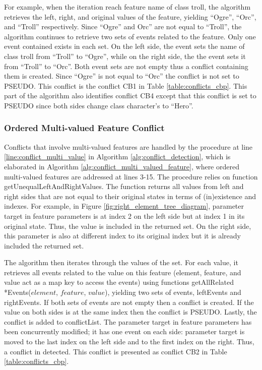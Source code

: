 For example, when the iteration reach feature \textsf{name} of class \textsf{troll}, the algorithm retrieves the left, right, and original values of the feature, yielding ``Ogre'', ``Orc'', and ``Troll'' respectively. Since ``Ogre'' and Orc'' are not equal to ``Troll'', the algorithm continues to retrieve two sets of events related to the feature. Only one event contained exists in each set. On the left side, the event sets the name of class \textsf{troll} from ``Troll'' to ``Ogre'', while on the right side, the the event sets it from ``Troll'' to ``Orc''. Both event sets are not empty thus a conflict containing them is created. Since ``Ogre'' is not equal to ``Orc'' the conflict is not set to \textsf{PSEUDO}. This conflict is the conflict \textsf{CB1} in Table \ref{table:conflicts_cbp}. This part of the algorithm also identifies conflict \textsf{CB4} except that this conflict is set to \textsf{PSEUDO} since both sides change class \textsf{character}'s  to ``Hero''.   

\subsubsection{Ordered Multi-valued Feature Conflict} 
\label{sec:ordered_conflict}
Conflicts that involve multi-valued features are handled by the procedure at line \ref{line:conflict_multi_value} in Algorithm \ref{alg:conflict_detection}, which is elaborated in Algorithm \ref{alg:conflict_multi_valued_feature}, where ordered multi-valued features are addressed at lines 3-15. The procedure relies on function \textsf{getUnequalLeftAndRightValues}. The function returns all values from left and right sides that are not equal to their original states in terms of (in)existence and indexes. For example, in Figure \ref{fig:right_element_tree_diagram}, parameter \textsf{target} in feature \textsf{parameters} is at index 2 on the left side but at index 1 in its original state. Thus, the value is included in the returned set. On the right side, this parameter is also at different index to its original index but it is already included the returned set. 

The algorithm then iterates through the values of the set. For each value, it retrieves all events related to the value on this feature (element, feature, and value act as a map key to access the events) using functions \textsf{getAllRelated *Events($element$, $feature$, $value$)}, yielding two sets of events, \textsf{leftEvents} and \textsf{rightEvents}. If both sets of events are not empty then a conflict is created. If the value on both sides is at the same index then the conflict is \textsf{PSEUDO}. Lastly, the conflict is added to \textsf{conflictList}. The parameter \textsf{target} in feature \textsf{parameters} has been concurrently modified; it has one event on each side: parameter \textsf{target} is moved to the last index on the left side and to the first index on the right. Thus, a conflict in detected. This conflict is presented as conflict \textsf{CB2} in Table \ref{table:conflicts_cbp}.

